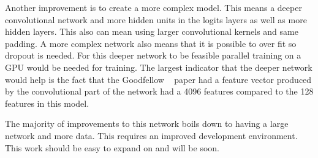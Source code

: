 \documentclass[12pt,twocolumn,letterpaper]{article}
\begin{document}
Another improvement is to create a more complex model. This means a deeper 
convolutional network and more hidden units in the logits layers as well as more 
hidden layers. This also can mean using larger convolutional kernels and same 
padding. A more complex network also means that it is possible to over fit so 
dropout is needed. For this deeper network to be feasible parallel training on a 
GPU would be needed for training. The largest indicator that the deeper network 
would help is the fact that the Goodfellow \etal ~\cite{goodfellow} paper had a 
feature vector produced by the convolutional part of the network had a 4096 
features compared to the 128 features in this model.

The majority of improvements to this network boils down to having a large network 
and more data. This requires an improved development environment. This work 
should be easy to expand on and will be soon. 

{\small


}
\end{document}
